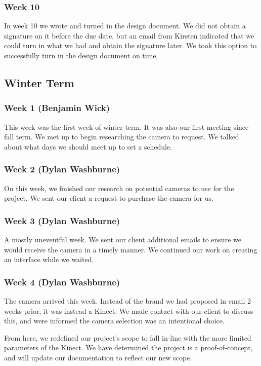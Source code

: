 \documentclass[onecolumn, draftclsnofoot,10pt, compsoc]{IEEEtran}
\begin{document}
\subsubsection{Week 10}
In week 10 we wrote and turned in the design document.
We did not obtain a signature on it before the due date, but an email from Kirsten indicated that we could turn in what we had and obtain the signature later.
We took this option to successfully turn in the design document on time.

\subsection{Winter Term}

\subsubsection{Week 1 (Benjamin Wick) }
This week was the first week of winter term. It was also our first meeting since fall term. We met up to begin researching the camera to request. We talked about what days we should meet up to set a schedule.

\subsubsection{Week 2 (Dylan Washburne) }
On this week, we finished our research on potential cameras to use for the project.  We sent our client a request to purchase the camera for us. 

\subsubsection{Week 3 (Dylan Washburne) }
A mostly uneventful week.  We sent our client additional emails to ensure we would receive the camera in a timely manner.  We continued our work on creating an interface while we waited.

\subsubsection{Week 4 (Dylan Washburne) }
The camera arrived this week.  Instead of the brand we had proposed in email 2 weeks prior, it was instead a Kinect.  We made contact with our client to discuss this, and were informed the camera selection was an intentional choice.

From here, we redefined our project's scope to fall in-line with the more limited parameters of the Kinect.  We have determined the project is a proof-of-concept, and will update our documentation to reflect our new scope.
\end{document}
